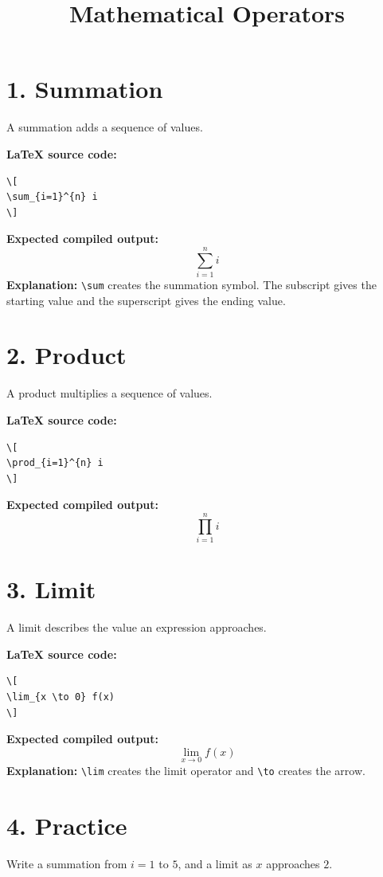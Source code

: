 \documentclass{article}
\title{Mathematical Operators}
\author{ }
\date{}
\begin{document}
\maketitle

\section*{1. Summation}
A summation adds a sequence of values.

\textbf{LaTeX source code:}
\begin{verbatim}
\[
\sum_{i=1}^{n} i
\]
\end{verbatim}
\textbf{Expected compiled output:}
\[
\sum_{i=1}^{n} i
\]
\textbf{Explanation:} \verb|\sum| creates the summation symbol. The subscript gives the starting value and the superscript gives the ending value.

\section*{2. Product}
A product multiplies a sequence of values.

\textbf{LaTeX source code:}
\begin{verbatim}
\[
\prod_{i=1}^{n} i
\]
\end{verbatim}
\textbf{Expected compiled output:}
\[
\prod_{i=1}^{n} i
\]

\section*{3. Limit}
A limit describes the value an expression approaches.

\textbf{LaTeX source code:}
\begin{verbatim}
\[
\lim_{x \to 0} f(x)
\]
\end{verbatim}
\textbf{Expected compiled output:}
\[
\lim_{x \to 0} f(x)
\]
\textbf{Explanation:} \verb|\lim| creates the limit operator and \verb|\to| creates the arrow.

\section*{4. Practice}
Write a summation from \(i=1\) to \(5\), and a limit as \(x\) approaches \(2\).
\end{document}
